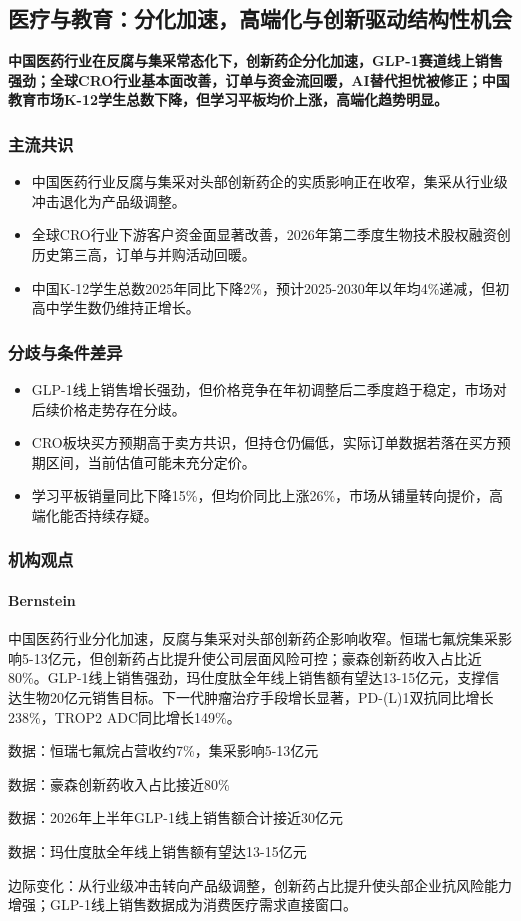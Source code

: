 \documentclass[11pt]{ctexart}
\begin{document}
\subsection{医疗与教育：分化加速，高端化与创新驱动结构性机会}
\textbf{中国医药行业在反腐与集采常态化下，创新药企分化加速，GLP-1赛道线上销售强劲；全球CRO行业基本面改善，订单与资金流回暖，AI替代担忧被修正；中国教育市场K-12学生总数下降，但学习平板均价上涨，高端化趋势明显。}
\subsubsection*{主流共识}
\begin{itemize}
  \item 中国医药行业反腐与集采对头部创新药企的实质影响正在收窄，集采从行业级冲击退化为产品级调整。
  \item 全球CRO行业下游客户资金面显著改善，2026年第二季度生物技术股权融资创历史第三高，订单与并购活动回暖。
  \item 中国K-12学生总数2025年同比下降2\%，预计2025-2030年以年均4\%递减，但初高中学生数仍维持正增长。
\end{itemize}
\subsubsection*{分歧与条件差异}
\begin{itemize}
  \item GLP-1线上销售增长强劲，但价格竞争在年初调整后二季度趋于稳定，市场对后续价格走势存在分歧。
  \item CRO板块买方预期高于卖方共识，但持仓仍偏低，实际订单数据若落在买方预期区间，当前估值可能未充分定价。
  \item 学习平板销量同比下降15\%，但均价同比上涨26\%，市场从铺量转向提价，高端化能否持续存疑。
\end{itemize}
\subsubsection*{机构观点}
\paragraph{Bernstein} 中国医药行业分化加速，反腐与集采对头部创新药企影响收窄。恒瑞七氟烷集采影响5-13亿元，但创新药占比提升使公司层面风险可控；豪森创新药收入占比近80\%。GLP-1线上销售强劲，玛仕度肽全年线上销售额有望达13-15亿元，支撑信达生物20亿元销售目标。下一代肿瘤治疗手段增长显著，PD-(L)1双抗同比增长238\%，TROP2 ADC同比增长149\%。
{\small\color{refgray}数据：恒瑞七氟烷占营收约7\%，集采影响5-13亿元\par}
{\small\color{refgray}数据：豪森创新药收入占比接近80\%\par}
{\small\color{refgray}数据：2026年上半年GLP-1线上销售额合计接近30亿元\par}
{\small\color{refgray}数据：玛仕度肽全年线上销售额有望达13-15亿元\par}
{\small\color{refgray}边际变化：从行业级冲击转向产品级调整，创新药占比提升使头部企业抗风险能力增强；GLP-1线上销售数据成为消费医疗需求直接窗口。\par}
\end{document}
